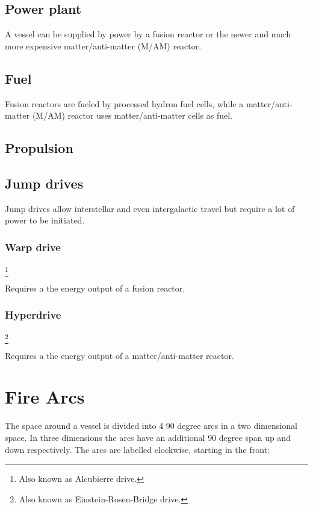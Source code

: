 \subsection{Power plant}

A vessel can be supplied by power by a fusion reactor or the newer and much more expensive matter/anti-matter (M/AM) reactor.

\subsection{Fuel}
\label{sub:Fuel}

Fusion reactors are fueled by processed hydron fuel cells, while  a matter/anti-matter (M/AM) reactor uses matter/anti-matter cells as fuel.

\subsection{Propulsion}


\subsection{Jump drives}

Jump drives allow interstellar and even intergalactic travel but require a lot of power to be initiated.

\subsubsection{Warp drive}\footnote{Also known as Alcubierre drive.}

Requires a the energy output of a fusion reactor.

\subsubsection{Hyperdrive}\footnote{Also known as Einstein-Rosen-Bridge drive.}

Requires a the energy output of a matter/anti-matter reactor.

\section{Fire Arcs}
\label{sec:Fire Arcs}

The space around a vessel is divided into 4 90 degree arcs in a two dimensional space. In three dimensions the arcs have an additional 90 degree span up and down respectively. The arcs are labelled clockwise, starting in the front:

